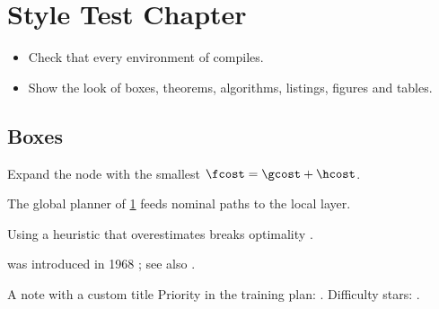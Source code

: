 \chapter{Style Test Chapter}
\label{ch:styletest}
\begin{objectives}
\begin{itemize}
  \item Check that every environment of  compiles.
  \item Show the look of boxes, theorems, algorithms, listings, figures and tables.
\end{itemize}
\end{objectives}
\section{Boxes}
\begin{keyidea}
Expand the node with the smallest $\fcost = \gcost + \hcost$.
\end{keyidea}
\begin{dronebox}
The global planner of \cref{ch:styletest} feeds nominal paths to the local layer.
\end{dronebox}
\begin{pitfall}
Using a heuristic that overestimates breaks optimality \cite{hart1968formal}.
\end{pitfall}
\begin{historynote}
\astar was introduced in 1968 \cite{hart1968formal}; see also \textcite{dijkstra1959note}.
\end{historynote}
\begin{notebox}{A note with a custom title}
Priority in the training plan: . Difficulty stars: .
\end{notebox}
